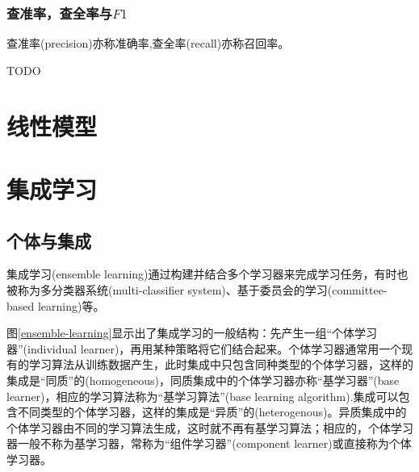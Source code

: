 \documentclass[cn,hazy,black,normal]{elegantnote}
\numberwithin{equation}{section}
\numberwithin{figure}{section}
\begin{document}
			\subsubsection{查准率，查全率与$F1$}
				查准率(precision)亦称准确率,查全率(recall)亦称召回率。
				
				TODO
	
	\section{线性模型}
			
	\section{}
	
	\section{}
	
	\section{}
	
	\section{}
		
	\section{集成学习}		 
		\subsection{个体与集成}
			集成学习(ensemble learning)通过构建并结合多个学习器来完成学习任务，有时也被称为多分类器系统(multi-classifier system)、基于委员会的学习(committee-based learning)等。
			
			图\ref{ensemble-learning}显示出了集成学习的一般结构：先产生一组“个体学习器”(individual learner)，再用某种策略将它们结合起来。个体学习器通常用一个现有的学习算法从训练数据产生，此时集成中只包含同种类型的个体学习器，这样的集成是“同质”的(homogeneous)，同质集成中的个体学习器亦称“基学习器”(base learner)，相应的学习算法称为“基学习算法”(base learning algorithm).集成可以包含不同类型的个体学习器，这样的集成是“异质”的(heterogenous)。异质集成中的个体学习器由不同的学习算法生成，这时就不再有基学习算法；相应的，个体学习器一般不称为基学习器，常称为“组件学习器”(component learner)或直接称为个体学习器。
			
\end{document}
